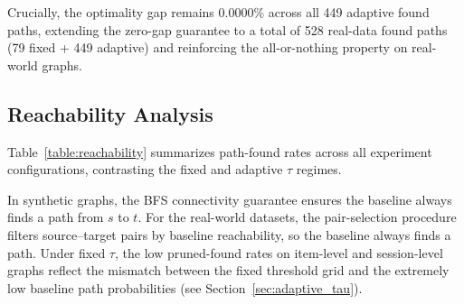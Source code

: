 Crucially, the optimality gap remains \textbf{$0.0000\%$} across all 449 adaptive found paths, extending the zero-gap guarantee to a total of 528 real-data found paths (79 fixed + 449 adaptive) and reinforcing the all-or-nothing property on real-world graphs.

\subsection{Reachability Analysis}

Table~\ref{table:reachability} summarizes path-found rates across all experiment configurations, contrasting the fixed and adaptive $\tau$ regimes.

\begin{table}[htbp]
\centering
\small
\renewcommand{\arraystretch}{1.3}
\caption[Reachability summary]{Path-found rates under fixed and adaptive $\tau$ regimes.}
\label{table:reachability}
\end{table}

In synthetic graphs, the BFS connectivity guarantee ensures the baseline always finds a path from $s$ to $t$. For the real-world datasets, the pair-selection procedure filters source--target pairs by baseline reachability, so the baseline always finds a path. Under fixed $\tau$, the low pruned-found rates on item-level and session-level graphs reflect the mismatch between the fixed threshold grid and the extremely low baseline path probabilities (see Section~\ref{sec:adaptive_tau}).

